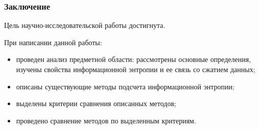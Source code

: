\documentclass{bmstu-pr}
\begin{document}
\begin{frame}
    \frametitle{Заключение}
    Цель научно-исследовательской работы достигнута.
    
	При написании данной работы:

	\begin{itemize}
		\item проведен анализ предметной области: рассмотрены основные определения, изучены свойства информационной энтропии и ее связь со сжатием данных;
		\item описаны существующие методы подсчета информационной энтропии;
		\item выделены критерии сравнения описанных методов;
		\item проведено сравнение методов по выделенным критериям.
	\end{itemize}
\end{frame}
\end{document}
